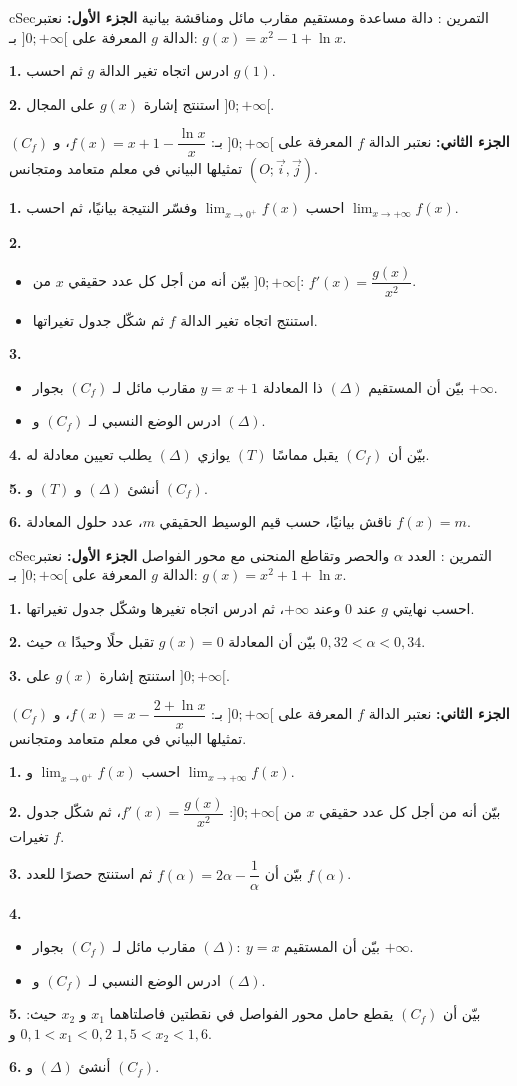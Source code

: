 \documentclass[12pt,a4paper]{article}
\newenvironment{BOX}[2]{\begin{otherlanguage}{english}\begin{arbox}{#1}{#2}}{\end{arbox}\end{otherlanguage}}
\newcounter{exo}
\newenvironment{tamrin}[1]{\stepcounter{exo}\begin{BOX}{cSec}{التمرين \theexo: #1}}{\end{BOX}}
\newenvironment{sq}{\begin{itemize}[leftmargin=2.4em,itemsep=3pt]}{\end{itemize}}
\newcommand{\qa}{\item[(أ)]}\newcommand{\qb}{\item[(ب)]}\newcommand{\qc}{\item[(جـ)]}\newcommand{\qd}{\item[(د)]}\newcommand{\qe}{\item[(هـ)]}
\newcommand{\QQ}[1]{\par\smallskip\textbf{#1.} }
\begin{document}
\begin{tamrin}{دالة مساعدة ومستقيم مقارب مائل ومناقشة بيانية}
\textbf{الجزء الأول:} نعتبر الدالة $g$ المعرفة على $]0;+\infty[$ بـ: $g(x)=x^2-1+\ln x$.
\QQ{1} ادرس اتجاه تغير الدالة $g$ ثم احسب $g(1)$.
\QQ{2} استنتج إشارة $g(x)$ على المجال $]0;+\infty[$.

\textbf{الجزء الثاني:} نعتبر الدالة $f$ المعرفة على $]0;+\infty[$ بـ: $f(x)=x+1-\dfrac{\ln x}{x}$، و $(C_f)$ تمثيلها البياني في معلم متعامد ومتجانس $(O;\vec i,\vec j)$.
\QQ{1} احسب $\displaystyle\lim_{x\to0^{+}}f(x)$ وفسّر النتيجة بيانيًا، ثم احسب $\displaystyle\lim_{x\to+\infty}f(x)$.
\QQ{2}
\begin{sq}
\qa بيّن أنه من أجل كل عدد حقيقي $x$ من $]0;+\infty[$: $f'(x)=\dfrac{g(x)}{x^2}$.
\qb استنتج اتجاه تغير الدالة $f$ ثم شكّل جدول تغيراتها.
\end{sq}
\QQ{3}
\begin{sq}
\qa بيّن أن المستقيم $(\Delta)$ ذا المعادلة $y=x+1$ مقارب مائل لـ $(C_f)$ بجوار $+\infty$.
\qb ادرس الوضع النسبي لـ $(C_f)$ و $(\Delta)$.
\end{sq}
\QQ{4} بيّن أن $(C_f)$ يقبل مماسًا $(T)$ يوازي $(\Delta)$ يطلب تعيين معادلة له.
\QQ{5} أنشئ $(\Delta)$ و $(T)$ و $(C_f)$.
\QQ{6} ناقش بيانيًا، حسب قيم الوسيط الحقيقي $m$، عدد حلول المعادلة $f(x)=m$.
\end{tamrin}

\begin{tamrin}{العدد $\alpha$ والحصر وتقاطع المنحنى مع محور الفواصل}
\textbf{الجزء الأول:} نعتبر الدالة $g$ المعرفة على $]0;+\infty[$ بـ: $g(x)=x^2+1+\ln x$.
\QQ{1} احسب نهايتي $g$ عند $0$ وعند $+\infty$، ثم ادرس اتجاه تغيرها وشكّل جدول تغيراتها.
\QQ{2} بيّن أن المعادلة $g(x)=0$ تقبل حلًا وحيدًا $\alpha$ حيث $0{,}32<\alpha<0{,}34$.
\QQ{3} استنتج إشارة $g(x)$ على $]0;+\infty[$.

\textbf{الجزء الثاني:} نعتبر الدالة $f$ المعرفة على $]0;+\infty[$ بـ: $f(x)=x-\dfrac{2+\ln x}{x}$، و $(C_f)$ تمثيلها البياني في معلم متعامد ومتجانس.
\QQ{1} احسب $\displaystyle\lim_{x\to0^{+}}f(x)$ و $\displaystyle\lim_{x\to+\infty}f(x)$.
\QQ{2} بيّن أنه من أجل كل عدد حقيقي $x$ من $]0;+\infty[$: $f'(x)=\dfrac{g(x)}{x^2}$، ثم شكّل جدول تغيرات $f$.
\QQ{3} بيّن أن $f(\alpha)=2\alpha-\dfrac1\alpha$ ثم استنتج حصرًا للعدد $f(\alpha)$.
\QQ{4}
\begin{sq}
\qa بيّن أن المستقيم $(\Delta):\ y=x$ مقارب مائل لـ $(C_f)$ بجوار $+\infty$.
\qb ادرس الوضع النسبي لـ $(C_f)$ و $(\Delta)$.
\end{sq}
\QQ{5} بيّن أن $(C_f)$ يقطع حامل محور الفواصل في نقطتين فاصلتاهما $x_1$ و $x_2$ حيث: $0{,}1<x_1<0{,}2$ و $1{,}5<x_2<1{,}6$.
\QQ{6} أنشئ $(\Delta)$ و $(C_f)$.
\end{tamrin}
\end{document}
